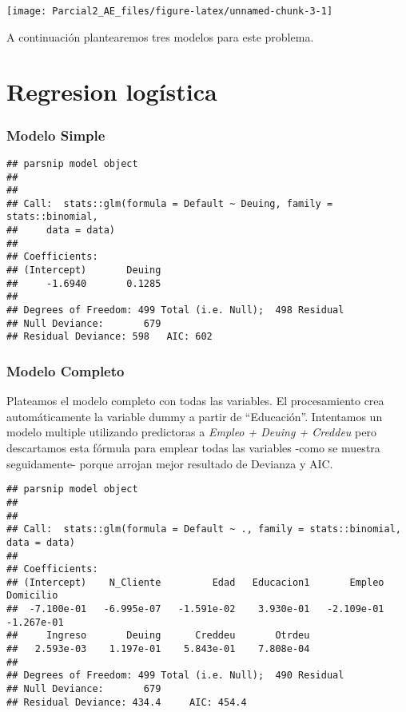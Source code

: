 \documentclass[
]{article}
\begin{document}
\begin{center}\texttt{[image: Parcial2\_AE\_files/figure-latex/unnamed-chunk-3-1]} \end{center}

A continuación plantearemos tres modelos para este problema.

\hypertarget{regresion-loguxedstica}{%
\section{Regresion logística}\label{regresion-loguxedstica}}

\hypertarget{modelo-simple}{%
\subsubsection{Modelo Simple}\label{modelo-simple}}

\begin{verbatim}
## parsnip model object
## 
## 
## Call:  stats::glm(formula = Default ~ Deuing, family = stats::binomial, 
##     data = data)
## 
## Coefficients:
## (Intercept)       Deuing  
##     -1.6940       0.1285  
## 
## Degrees of Freedom: 499 Total (i.e. Null);  498 Residual
## Null Deviance:       679 
## Residual Deviance: 598   AIC: 602
\end{verbatim}

\hypertarget{modelo-completo}{%
\subsubsection{Modelo Completo}\label{modelo-completo}}

Plateamos el modelo completo con todas las variables. El procesamiento
crea automáticamente la variable dummy a partir de ``Educación''.
Intentamos un modelo multiple utilizando predictoras a \emph{Empleo +
Deuing + Creddeu} pero descartamos esta fórmula para emplear todas las
variables -como se muestra seguidamente- porque arrojan mejor resultado
de Devianza y AIC.

\begin{verbatim}
## parsnip model object
## 
## 
## Call:  stats::glm(formula = Default ~ ., family = stats::binomial, data = data)
## 
## Coefficients:
## (Intercept)    N_Cliente         Edad   Educacion1       Empleo    Domicilio  
##  -7.100e-01   -6.995e-07   -1.591e-02    3.930e-01   -2.109e-01   -1.267e-01  
##     Ingreso       Deuing      Creddeu       Otrdeu  
##   2.593e-03    1.197e-01    5.843e-01    7.808e-04  
## 
## Degrees of Freedom: 499 Total (i.e. Null);  490 Residual
## Null Deviance:       679 
## Residual Deviance: 434.4     AIC: 454.4
\end{verbatim}
\end{document}
